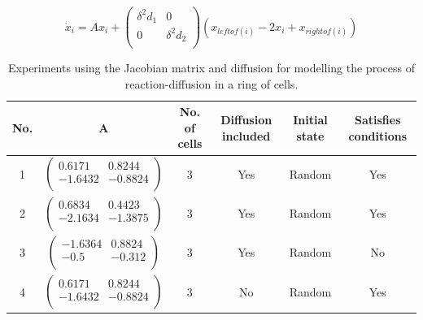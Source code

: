 \begin{equation}
\label{lrdm}
\dot{x}_i = Ax_i + \begin{pmatrix}
\delta^2d_1 & 0 \\
0 & \delta^2d_2 \\
\end{pmatrix}(x_{leftof(i)} - 2x_i + x_{rightof(i)})
\end{equation}

\begin{table}
\begin{center}
\caption{Experiments using the Jacobian matrix and diffusion for modelling the process of reaction-diffusion in a ring of cells.}
\label{linexp}
\begin{tabular}{| c | c | c | c | c | c |}
\hline
No. & A & No. of cells & Diffusion included & Initial state & Satisfies conditions\\ \hline
1 & $ \begin{pmatrix}
        0.6171 & 0.8244 \\
        -1.6432 & -0.8824 \\
\end{pmatrix} $ & 3 & Yes & Random & Yes\\ \hline
2 & $\begin{pmatrix}
        0.6834 & 0.4423 \\
        -2.1634 & -1.3875 \\
\end{pmatrix} $ & 3 & Yes & Random & Yes\\ \hline
3 & $\begin{pmatrix}
        -1.6364 & 0.8824 \\
        -0.5 & -0.312 \\
\end{pmatrix} $ & 3 & Yes & Random & No \\ \hline
4 & $ \begin{pmatrix}
        0.6171 & 0.8244 \\
       -1.6432 & -0.8824 \\
\end{pmatrix} $ & 3 & No & Random & Yes \\ \hline
\end{tabular}
\end{center}
\end{table}

